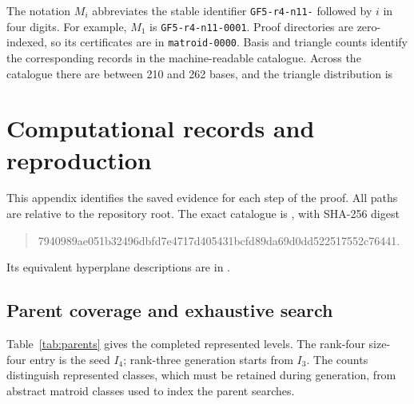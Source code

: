 \documentclass[11pt,a4paper]{article}
\theoremstyle{definition}
\begin{document}
The notation $M_i$ abbreviates the stable identifier
\texttt{GF5-r4-n11-} followed by $i$ in four digits. For example,
$M_1$ is \texttt{GF5-r4-n11-0001}. Proof directories are
zero-indexed, so its certificates are in
\texttt{matroid-0000}. Basis and triangle counts identify the
corresponding records in the machine-readable catalogue. Across
the catalogue there are between 210 and 262 bases, and the
triangle distribution is
\[

\]

\begingroup
\raggedright

\par\endgroup

\section{Computational records and reproduction}\label{sec:reproduction}

This appendix identifies the saved evidence for each step of
the proof. All paths are relative to the repository root.
The exact catalogue is
, with SHA-256 digest
\begin{quote}\small\ttfamily
7940989ae051b32496dbfd7e4717d405431bcfd89da69d0dd522517552c76441.
\end{quote}
Its equivalent hyperplane descriptions are in
.

\subsection{Parent coverage and exhaustive search}

Table~\ref{tab:parents} gives the completed represented levels.
The rank-four size-four entry is the seed $I_4$; rank-three
generation starts from $I_3$. The counts distinguish represented
classes, which must be retained during generation, from abstract
matroid classes used to index the parent searches.

\begin{table}[htbp]
\centering

\caption{Complete simple represented catalogues. ``Field'' counts
field-isomorphism classes; ``abstract'' counts matroid classes.}
\label{tab:parents}
\end{table}
\end{document}
